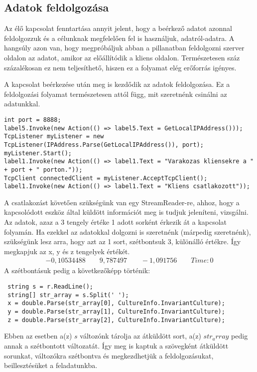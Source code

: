 \documentclass{thesis-ekf}
\theoremstyle{definition}
\theoremstyle{remark}
\begin{document}
\subsection{Adatok feldolgozása}
Az élő kapcsolat fenntartása annyit jelent, hogy a beérkező adatot azonnal feldolgozzuk és a célunknak megfelelően fel is használjuk, adatról-adatra. A hangsúly azon van, hogy megpróbáljuk abban a pillanatban feldolgozni szerver oldalon az adatot, amikor az előállítódik a kliens oldalon. Természetesen száz százalékosan ez nem teljesíthető, hiszen ez a folyamat elég erőforrás igényes.
\par A kapcsolat beérkezése után meg is kezdődik az adatok feldolgozása. Ez a feldolgozási folyamat természetesen attól függ, mit szeretnénk csinálni az adatunkkal.
\begin{lstlisting}
int port = 8888;
label5.Invoke(new Action(() => label5.Text = GetLocalIPAddress()));
TcpListener myListener = new TcpListener(IPAddress.Parse(GetLocalIPAddress()), port);
myListener.Start();
label1.Invoke(new Action(() => label1.Text = "Varakozas kliensekre a " + port + " porton."));
TcpClient connectedClient = myListener.AcceptTcpClient();
label1.Invoke(new Action(() => label1.Text = "Kliens csatlakozott"));
\end{lstlisting}
A csatlakozást követően szükségünk van egy StreamReader-re, ahhoz, hogy a kapcsolódott eszköz által küldött információt meg is tudjuk jeleníteni, vizsgálni.
Az adatok, azaz a 3 tengely értéke 1 adott sorként érkezik át a kapcsolat folyamán. Ha ezekkel az adatokkal dolgozni is szeretnénk (márpedig szeretnénk), szükségünk lesz arra, hogy azt az 1 sort, szétbontsuk 3, különálló értékre. Így megkapjuk az x, y és z tengelyek értékét.
\begin{align*}
-0,10534488 \qquad 9,787497 \qquad-1,091756\qquad Time:0
\end{align*}
 A szétbontásuk pedig a következőképp történik:
 \begin{lstlisting}
 string s = r.ReadLine();
 string[] str_array = s.Split(' ');
 x = double.Parse(str_array[0], CultureInfo.InvariantCulture);
 y = double.Parse(str_array[1], CultureInfo.InvariantCulture);
 z = double.Parse(str_array[2], CultureInfo.InvariantCulture);
 \end{lstlisting}
Ebben az esetben a(z) $s$ változónk tárolja az átküldött sort, a(z) $str_array$ pedig annak a szétbontott változatát. Így meg is kaptuk a szövegként átküldött sorunkat, változókra szétbontva és megkezdhetjük a feldolgozásukat, beillesztésüket a feladatunkba.
\pagebreak
\end{document}
